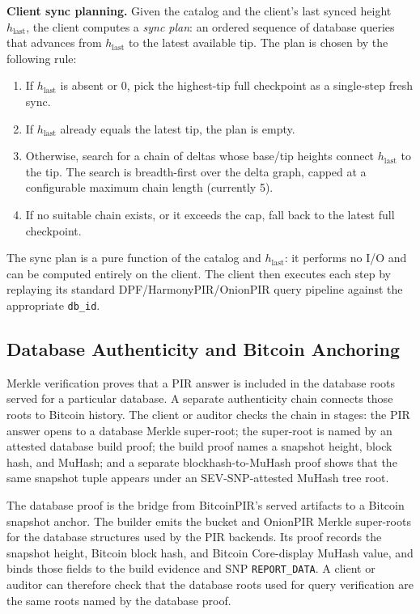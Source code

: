 \textbf{Client sync planning.} Given the catalog and the client's last synced height $h_\text{last}$, the client computes a \emph{sync plan}: an ordered sequence of database queries that advances from $h_\text{last}$ to the latest available tip. The plan is chosen by the following rule:
\begin{enumerate}[nolistsep,leftmargin=*]
    \item If $h_\text{last}$ is absent or $0$, pick the highest-tip full checkpoint as a single-step fresh sync.
    \item If $h_\text{last}$ already equals the latest tip, the plan is empty.
    \item Otherwise, search for a chain of deltas whose base/tip heights connect $h_\text{last}$ to the tip. The search is breadth-first over the delta graph, capped at a configurable maximum chain length (currently 5).
    \item If no suitable chain exists, or it exceeds the cap, fall back to the latest full checkpoint.
\end{enumerate}
The sync plan is a pure function of the catalog and $h_\text{last}$: it performs no I/O and can be computed entirely on the client. The client then executes each step by replaying its standard DPF/HarmonyPIR/OnionPIR query pipeline against the appropriate \texttt{db\_id}.

\subsection{Database Authenticity and Bitcoin Anchoring}
\label{sec:database-authenticity}

Merkle verification proves that a PIR answer is included in the database roots served for a particular database. A separate authenticity chain connects those roots to Bitcoin history. The client or auditor checks the chain in stages: the PIR answer opens to a database Merkle super-root; the super-root is named by an attested database build proof; the build proof names a snapshot height, block hash, and MuHash; and a separate blockhash-to-MuHash proof shows that the same snapshot tuple appears under an SEV-SNP-attested MuHash tree root.

The database proof is the bridge from BitcoinPIR's served artifacts to a Bitcoin snapshot anchor. The builder emits the bucket and OnionPIR Merkle super-roots for the database structures used by the PIR backends. Its proof records the snapshot height, Bitcoin block hash, and Bitcoin Core-display MuHash value, and binds those fields to the build evidence and SNP \texttt{REPORT\_DATA}. A client or auditor can therefore check that the database roots used for query verification are the same roots named by the database proof.

